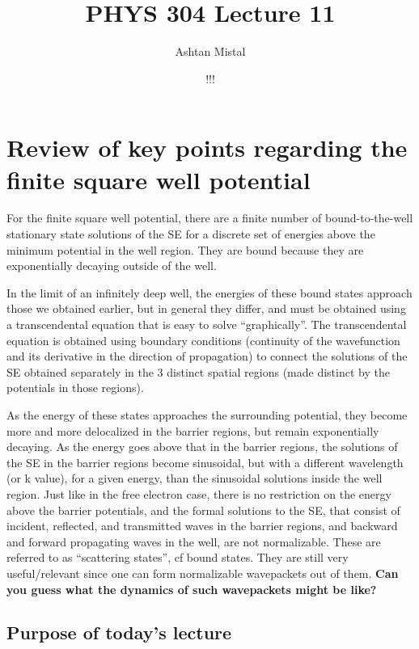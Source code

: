 \documentclass{article}
\title{PHYS 304 Lecture 11}
\author{Ashtan Mistal}
\date{!!!}
\begin{document}
\ifstandalone
\maketitle
\fi

\graphicspath{{./Lecture11/}}

\section{Review of key points regarding the finite square well potential}


For the finite square well potential, there are a finite number of bound-to-the-well stationary state solutions of the SE for a discrete set of energies above the minimum potential in the well region.  They are bound because they are exponentially decaying outside of the well.

In the limit of an infinitely deep well, the energies of these bound states approach those we obtained earlier, but in general they differ, and must be obtained using a transcendental equation that is easy to solve “graphically”.  The transcendental equation is obtained using boundary conditions (continuity of the wavefunction and its derivative in the direction of propagation) to connect the solutions of the SE obtained separately in the 3 distinct spatial regions (made distinct by the potentials in those regions).

As the energy of these states approaches the surrounding potential, they become more and more delocalized in the barrier regions, but remain exponentially decaying.  As the energy goes above that in the barrier regions, the solutions of the SE in the barrier regions become sinusoidal, but with a different wavelength (or k value), for a given energy, than the sinusoidal solutions inside the well region.  Just like in the free electron case, there is no restriction on the energy above the barrier potentials, and the formal solutions to the SE, that consist of incident, reflected, and transmitted waves in the barrier regions, and backward and forward propagating waves in the well, are not normalizable.  These are referred to as “scattering states”, cf bound states. They are still very useful/relevant since one can form normalizable wavepackets out of them. \textbf{Can you guess what the dynamics of such wavepackets might be like?}

\subsection{Purpose of today's lecture}
\end{document}
